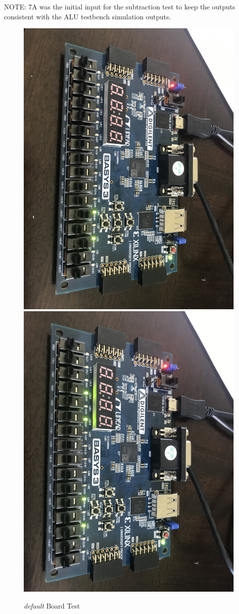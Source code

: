 \documentclass[11pt]{article}
\begin{document}
NOTE: 7A was the initial input for the subtraction test to keep the outputs consistent with the ALU testbench simulation outputs.

\begin{figure}[ht]\centering
	\includegraphics[angle=90, width=.8\textwidth]{default1}
	\includegraphics[angle=90, width=.8\textwidth]{default2}
	\caption{\textit{default} Board Test}
	\label{fig:sim_with_table}
\end{figure}
\end{document}
